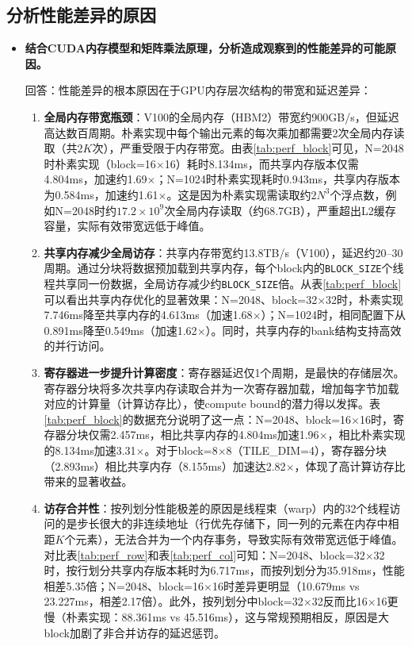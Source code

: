 \documentclass{SYSUReport}
\begin{document}
\subsection{分析性能差异的原因}

\begin{itemize}
    \item \textbf{结合CUDA内存模型和矩阵乘法原理，分析造成观察到的性能差异的可能原因。}\par
    回答：性能差异的根本原因在于GPU内存层次结构的带宽和延迟差异：
    \begin{enumerate}
        \item \textbf{全局内存带宽瓶颈}：V100的全局内存（HBM2）带宽约900GB/s，但延迟高达数百周期。朴素实现中每个输出元素的每次乘加都需要2次全局内存读取（共$2K$次），严重受限于内存带宽。由表\ref{tab:perf_block}可见，N=2048时朴素实现（block=16$\times$16）耗时8.134ms，而共享内存版本仅需4.804ms，加速约1.69$\times$；N=1024时朴素实现耗时0.943ms，共享内存版本为0.584ms，加速约1.61$\times$。这是因为朴素实现需读取约$2N^3$个浮点数，例如N=2048时约$17.2\times 10^9$次全局内存读取（约68.7GB），严重超出L2缓存容量，实际有效带宽远低于峰值。
        \item \textbf{共享内存减少全局访存}：共享内存带宽约13.8TB/s（V100），延迟约20--30周期。通过分块将数据预加载到共享内存，每个block内的\texttt{BLOCK\_SIZE}个线程共享同一份数据，全局访存减少约\texttt{BLOCK\_SIZE}倍。从表\ref{tab:perf_block}可以看出共享内存优化的显著效果：N=2048、block=32$\times$32时，朴素实现7.746ms降至共享内存的4.613ms（加速1.68$\times$）；N=1024时，相同配置下从0.891ms降至0.549ms（加速1.62$\times$）。同时，共享内存的bank结构支持高效的并行访问。
        \item \textbf{寄存器进一步提升计算密度}：寄存器延迟仅1个周期，是最快的存储层次。寄存器分块将多次共享内存读取合并为一次寄存器加载，增加每字节加载对应的计算量（计算访存比），使compute bound的潜力得以发挥。表\ref{tab:perf_block}的数据充分说明了这一点：N=2048、block=16$\times$16时，寄存器分块仅需2.457ms，相比共享内存的4.804ms加速1.96$\times$，相比朴素实现的8.134ms加速3.31$\times$。对于block=8$\times$8（TILE\_DIM=4），寄存器分块（2.893ms）相比共享内存（8.155ms）加速达2.82$\times$，体现了高计算访存比带来的显著收益。
        \item \textbf{访存合并性}：按列划分性能极差的原因是线程束（warp）内的32个线程访问的是步长很大的非连续地址（行优先存储下，同一列的元素在内存中相距$K$个元素），无法合并为一个内存事务，导致实际有效带宽远低于峰值。对比表\ref{tab:perf_row}和表\ref{tab:perf_col}可知：N=2048、block=32$\times$32时，按行划分共享内存版本耗时为6.717ms，而按列划分为35.918ms，性能相差5.35倍；N=2048、block=16$\times$16时差异更明显（10.679ms vs 23.227ms，相差2.17倍）。此外，按列划分中block=32$\times$32反而比16$\times$16更慢（朴素实现：88.361ms vs 45.516ms），这与常规预期相反，原因是大block加剧了非合并访存的延迟惩罚。
    \end{enumerate}


\end{itemize}
\end{document}
